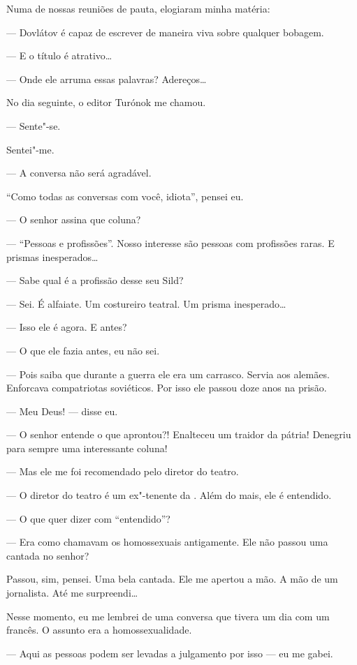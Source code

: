 Numa de nossas reuniões de pauta, elogiaram minha matéria:

--- Dovlátov é capaz de escrever de maneira viva sobre qualquer
bobagem.

--- E o título é atrativo\ldots{}

--- Onde ele arruma essas palavras? Adereços\ldots{}

No dia seguinte, o editor Turónok me chamou.

--- Sente"-se.

Sentei"-me.

--- A conversa não será agradável.

``Como todas as conversas com você, idiota'', pensei eu.

--- O senhor assina que coluna?

--- ``Pessoas e profissões''. Nosso interesse são pessoas com
profissões raras. E prismas inesperados\ldots{}

--- Sabe qual é a profissão desse seu Sild?

--- Sei. É alfaiate. Um costureiro teatral. Um prisma
inesperado\ldots{}

--- Isso ele é agora. E antes?

--- O que ele fazia antes, eu não sei.

--- Pois saiba que durante a guerra ele era um carrasco. Servia
aos alemães. Enforcava compatriotas soviéticos. Por isso ele passou doze
anos na prisão.

--- Meu Deus! --- disse eu.

--- O senhor entende o que aprontou?! Enalteceu um traidor da
pátria! Denegriu para sempre uma interessante coluna!

--- Mas ele me foi recomendado pelo diretor do teatro.

--- O diretor do teatro é um ex"-tenente da . Além do mais, ele
é entendido.

--- O que quer dizer com ``entendido''?

--- Era como chamavam os homossexuais antigamente. Ele não passou
uma cantada no senhor?

Passou, sim, pensei. Uma bela cantada. Ele me apertou a mão. A mão de um
jornalista. Até me surpreendi\ldots{}

Nesse momento, eu me lembrei de uma conversa que tivera um dia com um
francês. O assunto era a homossexualidade.

--- Aqui as pessoas podem ser levadas a julgamento por isso
--- eu me gabei.

